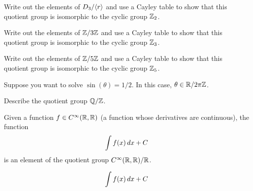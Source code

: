 \documentclass{ximera}
\begin{document}
\begin{exercise}
  Write out the elements of $D_3/\langle r\rangle$ and use a Cayley table to show
  that this quotient group is isomorphic to the cyclic group $\mathbb Z_2$.
\end{exercise}


\begin{exercise}
  Write out the elements of $\mathbb Z/3\mathbb Z$ and use a Cayley table to show
  that this quotient group is isomorphic to the cyclic group $\mathbb Z_3$.
\end{exercise}


\begin{exercise}
  Write out the elements of $\mathbb Z/5\mathbb Z$ and use a Cayley table to show
  that this quotient group is isomorphic to the cyclic group $\mathbb Z_5$.
\end{exercise}


\begin{example}
  Suppose you want to solve $\sin(\theta) = 1/2$. In this case,
  $\theta \in \mathbb R/2\pi\mathbb Z$.
\end{example}

\begin{exercise}
  Describe the quotient group $\mathbb Q/\mathbb Z$.
\end{exercise}

\begin{example}[Antiderivatives]
  Given a function $f\in C^\infty(\mathbb R,\mathbb R)$ (a function whose
  derivatives are continuous), the function
  \[
  \int f(x) \, d x + C
  \]
  is an element of the quotient group $C^\infty(\mathbb R,\mathbb R)/\mathbb R$.
\end{example}






\[
\int f(x) \, d x + C
\]
\end{document}
